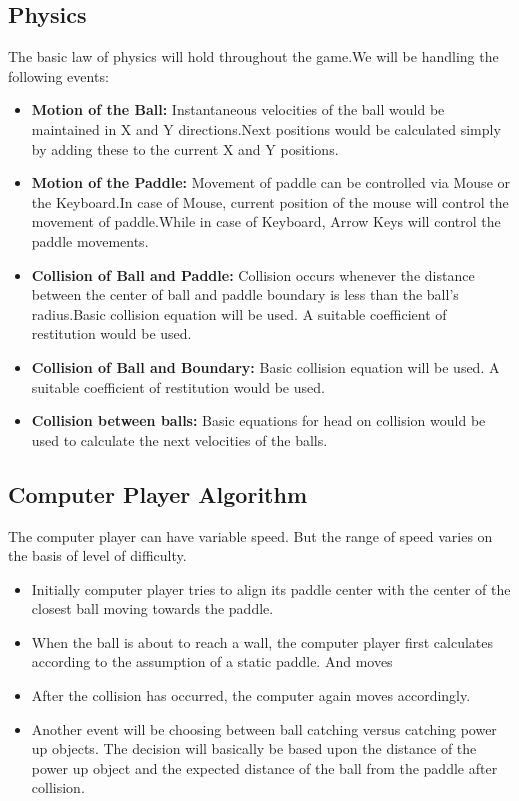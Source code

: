 \documentclass{article}
\begin{document}
			\subsection{Physics}
			\par\noindent The basic law of physics will hold throughout the game.We will be handling the following events:
			\begin{itemize}
			\item \textbf{Motion of the Ball:} Instantaneous velocities of the ball would be maintained in X and Y directions.Next positions would be calculated simply by adding these to the current X and Y positions.
			\item \textbf{Motion of the Paddle:} Movement of paddle can be controlled via Mouse or the Keyboard.In case of Mouse, current position of the mouse will control the movement of paddle.While in case of Keyboard, Arrow Keys will control the paddle movements.
			\item \textbf{Collision of Ball and Paddle:} Collision occurs whenever the distance between the center of ball and paddle boundary is less than the ball's radius.Basic collision equation will be used. A suitable coefficient of restitution would be used.
			\item \textbf{Collision of Ball and Boundary:} Basic collision equation will be used. A suitable coefficient of restitution would be used.
			\item \textbf{Collision between balls:} Basic equations for head on collision would be used to calculate the next velocities of the balls.

			\end{itemize}
			

			\subsection{Computer Player Algorithm}
			\par\noindent The computer player can have variable speed. But the range of speed varies on the basis of level of difficulty.

			\begin{itemize}
			\item Initially computer player tries to align its paddle center with the center of the closest ball moving towards the paddle.
			\item When the ball is about to reach a wall, the computer player first calculates according to the assumption of a static paddle. And moves
			\item After the collision has occurred, the computer again moves accordingly.
			\item Another event will be choosing between ball catching versus catching power up objects. The decision will basically be based upon the distance of the power up object and the expected distance of the ball from the paddle after collision.
			\end{itemize}
\end{document}
